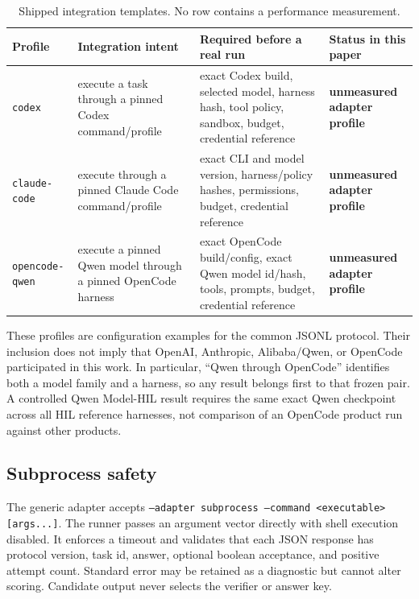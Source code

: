 \documentclass[11pt]{article}
\theoremstyle{definition}
\begin{document}
\begin{table}[H]
\centering\small
\begin{tabularx}{\textwidth}{@{}lYYY@{}}
\toprule
Profile & Integration intent & Required before a real run & Status in this paper \\
\midrule
\texttt{codex} & execute a task through a pinned Codex command/profile & exact Codex build, selected model, harness hash, tool policy, sandbox, budget, credential reference & \textbf{unmeasured adapter profile} \\
\texttt{claude-code} & execute through a pinned Claude Code command/profile & exact CLI and model version, harness/policy hashes, permissions, budget, credential reference & \textbf{unmeasured adapter profile} \\
\texttt{opencode-qwen} & execute a pinned Qwen model through a pinned OpenCode harness & exact OpenCode build/config, exact Qwen model id/hash, tools, prompts, budget, credential reference & \textbf{unmeasured adapter profile} \\
\bottomrule
\end{tabularx}
\caption{Shipped integration templates. No row contains a performance measurement.}
\label{tab:profiles}
\end{table}

These profiles are configuration examples for the common JSONL protocol. Their inclusion does not imply that OpenAI, Anthropic, Alibaba/Qwen, or OpenCode participated in this work. In particular, ``Qwen through OpenCode'' identifies both a model family and a harness, so any result belongs first to that frozen pair. A controlled Qwen Model-HIL result requires the same exact Qwen checkpoint across all HIL reference harnesses, not comparison of an OpenCode product run against other products.

\subsection{Subprocess safety}

The generic adapter accepts \texttt{--adapter subprocess --command <executable> [args...]}. The runner passes an argument vector directly with shell execution disabled. It enforces a timeout and validates that each JSON response has protocol version, task id, answer, optional boolean acceptance, and positive attempt count. Standard error may be retained as a diagnostic but cannot alter scoring. Candidate output never selects the verifier or answer key.
\end{document}
